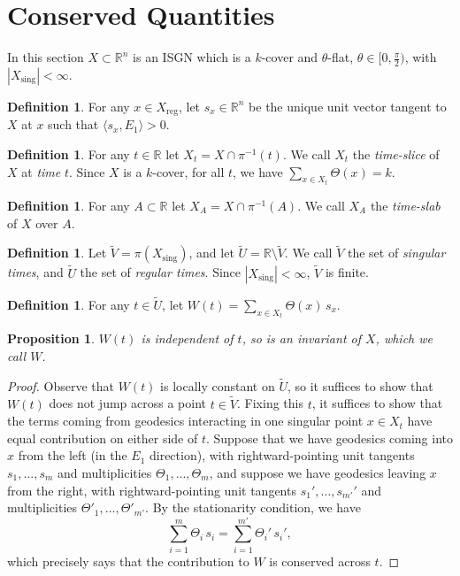 \documentclass[11pt,reqno,twoside]{amsart}
\newcommand{\reg}{\mathrm{reg}}
\newcommand{\sing}{\mathrm{sing}}
\newtheorem{proposition}[lemma]{Proposition}
\theoremstyle{definition}
\newtheorem{definition}[lemma]{Definition}
\begin{document}
\section{Conserved Quantities}
\label{sec:conservedquantities}

In this section $X \subset \mathbb{R}^n$ is an ISGN which is a $k$-cover and $\theta$-flat, $\theta \in [0,\frac{\pi}{2})$, with $|X_\sing| < \infty.$

\begin{definition}
    For any $x \in X_\reg$, let $s_x \in \mathbb{R}^n$ be the unique unit vector tangent to $X$ at $x$ such that $\langle s_x,E_1\rangle > 0$.
\end{definition}

\begin{definition}
    For any $t \in \mathbb{R}$ let $X_t = X \cap \pi^{-1}(t)$. We call $X_t$ the \emph{time-slice} of $X$ at \emph{time} $t$.
    Since $X$ is a $k$-cover, for all $t$, we have $\sum_{x \in X_t} \Theta(x) = k.$
\end{definition}

\begin{definition}
    For any $A \subset \mathbb{R}$ let $X_A = X \cap \pi^{-1}(A)$. We call $X_A$ the \emph{time-slab} of $X$ over $A$.
\end{definition}



\begin{definition}
    Let $\tilde V = \pi(X_\sing)$, and let $\tilde U = \mathbb{R} \setminus \tilde V$. We call $\tilde V$ the set of \emph{singular times}, and $\tilde U$ the set of \emph{regular times}. Since $|X_\sing| < \infty$, $\tilde V$ is finite.
\end{definition}

\begin{definition}
    For any $t \in \tilde U$, let $W(t) = \sum_{x \in X_t} \Theta(x) \, s_x.$
\end{definition}

\begin{proposition} $W(t)$ is independent of $t$, so is an invariant of $X$, which we call $W$.
\end{proposition}

\begin{proof}
    Observe that $W(t)$ is locally constant on $\tilde U$, so it suffices to show that $W(t)$ does not jump across a point $t \in \tilde V$. Fixing this $t$, it suffices to show that the terms coming from geodesics interacting in one singular point $x \in X_t$ have equal contribution on either side of $t$. Suppose that we have geodesics coming into $x$ from the left (in the $E_1$ direction), with rightward-pointing unit tangents $s_1,\ldots,s_m$ and multiplicities $\Theta_1,\ldots,\Theta_m$, and suppose we have geodesics leaving $x$ from the right, with rightward-pointing unit tangents $s_1', \ldots, s_{m'}'$ and multiplicities $\Theta'_1,\ldots,\Theta'_{m'}$. By the stationarity condition, we have 
    \[\sum_{i=1}^m \Theta_i \, s_i = \sum_{i=1}^{m'} \Theta_i' \, s_i',\]
    which precisely says that the contribution to $W$ is conserved across $t$.
\end{proof}
\end{document}
